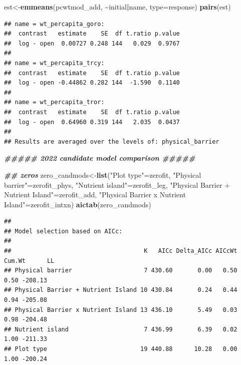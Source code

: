 \documentclass[
]{article}
\newenvironment{Shaded}{\begin{snugshade}}{\end{snugshade}}
\newcommand{\AttributeTok}[1]{\textcolor[rgb]{0.13,0.29,0.53}{#1}}
\newcommand{\DocumentationTok}[1]{\textcolor[rgb]{0.56,0.35,0.01}{\textbf{\textit{#1}}}}
\newcommand{\FunctionTok}[1]{\textcolor[rgb]{0.13,0.29,0.53}{\textbf{#1}}}
\newcommand{\NormalTok}[1]{#1}
\newcommand{\OtherTok}[1]{\textcolor[rgb]{0.56,0.35,0.01}{#1}}
\newcommand{\SpecialCharTok}[1]{\textcolor[rgb]{0.81,0.36,0.00}{\textbf{#1}}}
\newcommand{\StringTok}[1]{\textcolor[rgb]{0.31,0.60,0.02}{#1}}
\begin{document}
\begin{Shaded}
\begin{Highlighting}[]
\NormalTok{est}\OtherTok{\textless{}{-}}\FunctionTok{emmeans}\NormalTok{(pcwtmod\_add, }\SpecialCharTok{\textasciitilde{}}\NormalTok{initial}\SpecialCharTok{|}\NormalTok{name, }\AttributeTok{type=}\StringTok{\textquotesingle{}response\textquotesingle{}}\NormalTok{)}
\FunctionTok{pairs}\NormalTok{(est)}
\end{Highlighting}
\end{Shaded}

\begin{verbatim}
## name = wt_percapita_goro:
##  contrast   estimate    SE  df t.ratio p.value
##  log - open  0.00727 0.248 144   0.029  0.9767
## 
## name = wt_percapita_trcy:
##  contrast   estimate    SE  df t.ratio p.value
##  log - open -0.44862 0.282 144  -1.590  0.1140
## 
## name = wt_percapita_tror:
##  contrast   estimate    SE  df t.ratio p.value
##  log - open  0.64960 0.319 144   2.035  0.0437
## 
## Results are averaged over the levels of: physical_barrier
\end{verbatim}

\begin{Shaded}
\begin{Highlighting}[]
\DocumentationTok{\#\#\#\#\# 2022 candidate model comparison \#\#\#\#\# }

\DocumentationTok{\#\# zeros }
\NormalTok{zero\_candmods}\OtherTok{\textless{}{-}}\FunctionTok{list}\NormalTok{(}\StringTok{"Plot type"}\OtherTok{=}\NormalTok{zerofit, }
                    \StringTok{"Physical barrier"}\OtherTok{=}\NormalTok{zerofit\_phys,}
                    \StringTok{"Nutrient island"}\OtherTok{=}\NormalTok{zerofit\_leg,}
                    \StringTok{"Physical Barrier + Nutrient Island"}\OtherTok{=}\NormalTok{zerofit\_add,}
                    \StringTok{"Physical Barrier x Nutrient Island"}\OtherTok{=}\NormalTok{zerofit\_intxn)}
\FunctionTok{aictab}\NormalTok{(zero\_candmods)}
\end{Highlighting}
\end{Shaded}

\begin{verbatim}
## 
## Model selection based on AICc:
## 
##                                     K   AICc Delta_AICc AICcWt Cum.Wt      LL
## Physical barrier                    7 430.60       0.00   0.50   0.50 -208.13
## Physical Barrier + Nutrient Island 10 430.84       0.24   0.44   0.94 -205.08
## Physical Barrier x Nutrient Island 13 436.10       5.49   0.03   0.98 -204.48
## Nutrient island                     7 436.99       6.39   0.02   1.00 -211.33
## Plot type                          19 440.88      10.28   0.00   1.00 -200.24
\end{verbatim}
\end{document}
